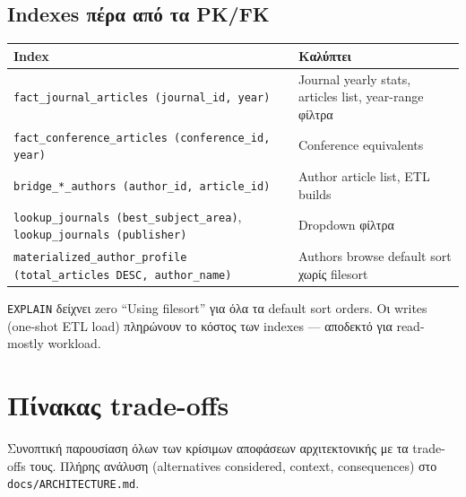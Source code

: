 \subsection{Indexes πέρα από τα PK/FK}

\begin{center}
\begin{tabular}{@{}p{} p{}@{}}
\toprule
\textbf{Index} & \textbf{Καλύπτει} \\
\midrule
\texttt{fact\_journal\_articles (journal\_id, year)}
& Journal yearly stats, articles list, year-range φίλτρα \\
\texttt{fact\_conference\_articles (conference\_id, year)}
& Conference equivalents \\
\texttt{bridge\_*\_authors (author\_id, article\_id)}
& Author article list, ETL builds \\
\texttt{lookup\_journals (best\_subject\_area)},
\texttt{lookup\_journals (publisher)}
& Dropdown φίλτρα \\
\texttt{materialized\_author\_profile (total\_articles DESC, author\_name)}
& Authors browse default sort χωρίς filesort \\
\bottomrule
\end{tabular}
\end{center}

\texttt{EXPLAIN} δείχνει zero ``Using filesort'' για όλα τα default
sort orders. Οι writes (one-shot ETL load) πληρώνουν το κόστος των
indexes --- αποδεκτό για read-mostly workload.

\section{Πίνακας trade-offs}

Συνοπτική παρουσίαση όλων των κρίσιμων αποφάσεων αρχιτεκτονικής
με τα trade-offs τους. Πλήρης ανάλυση (alternatives considered,
context, consequences) στο \texttt{docs/ARCHITECTURE.md}.

